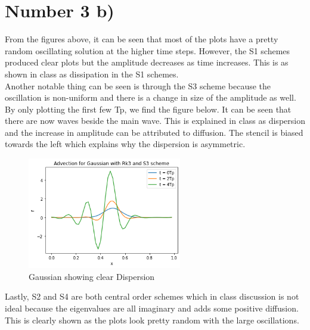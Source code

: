\documentclass{article}
\begin{document}
	\section*{Number 3 b)}
		From the figures above, it can be seen that most of the plots have a pretty random oscillating solution at the higher time steps. However, the S1 schemes produced clear plots but the amplitude decreases as time increases. This is as shown in class as dissipation in the S1 schemes.
		\\
		Another notable thing can be seen is through the S3 scheme because the oscillation is non-uniform and there is a change in size of the amplitude as well. By only plotting the first few Tp, we find the figure below. It can be seen that there are now waves beside the main wave. This is explained in class as dispersion and the increase in amplitude can be attributed to diffusion. The stencil is biased towards the left which explains why the dispersion is asymmetric. 
		
		\begin{figure}[H]
			\centering
			\includegraphics[width=0.6\textwidth]{ad3extra.png}
			\caption{\label{} Gaussian showing clear Dispersion}
		\end{figure}
	
		Lastly, S2 and S4 are both central order schemes which in class discussion is not ideal because the eigenvalues are all imaginary and adds some positive diffusion. This is clearly shown as the plots look pretty random with the large oscillations. 
	
\end{document}
